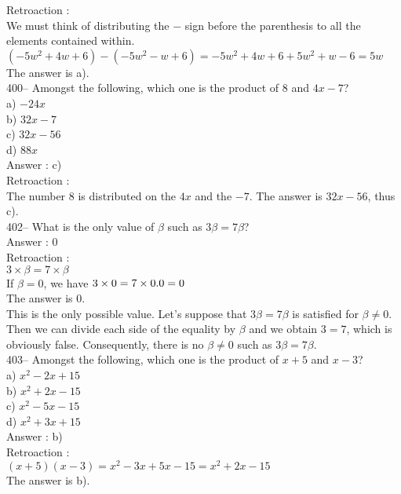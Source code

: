 ﻿\documentclass[letterpaper, 12pt]{article}
\begin{document}
Retroaction : \\
We must think of distributing the $-$ sign before the parenthesis to all the elements contained within.\\
$\left( -5w^{2}+4w+6\right) -\left(
-5w^{2}-w+6\right)=-5w^{2}+4w+6+5w^{2}+w-6=5w $\\
The answer is a).\\

400-- Amongst the following, which one is the product of 8 and
$4x-7$?\\
a) $-24x$\\
b) $32x-7$\\
c) $32x-56$\\
d) $88x$\\

Answer : c)\\

Retroaction : \\
The number 8 is distributed on the $4x$ and the $-7$. The answer is $32x-56$, thus c).\\


402-- What is the only value of $\beta$ such as $3\beta=7\beta$?\\

Answer : 0 \\

Retroaction : \\
$3\times \beta = 7 \times \beta $\\
If $\beta=0$, we have $3\times0=7\times 0.\\
0=0$\\
The answer is 0.\\

This is the only possible value. Let's suppose that $3\beta=7\beta$ is satisfied for $\beta\neq0$. Then we can divide each side of the equality by $\beta$ and we obtain $3=7$, which is obviously false. Consequently, there is no $\beta\neq0$ such as $3\beta=7\beta$.\\

403-- Amongst the following, which one is the product of $x+5$ and
$x-3$?\\
a) $x^{2}-2x+15$ \\
b) $x^{2}+2x-15$\\
c) $x^{2}-5x-15$\\
d) $x^{2}+3x+15$\\

Answer : b)\\

Retroaction : \\
$\left( x+5\right) \left( x-3\right)=x^{2}-3x+5x-15=x^{2}+2x-15$\\
The answer is b).\\
\end{document}
